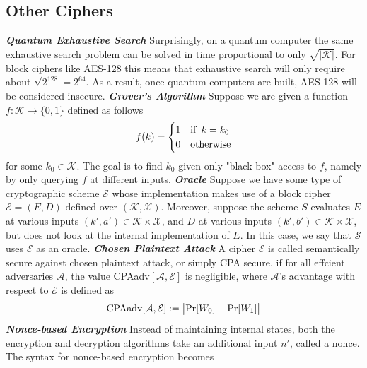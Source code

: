 \documentclass[a4paper,12pt,UTF8]{ctexart}
\begin{document}
\begin{spacing}{1.1}
\subsection{Other Ciphers}
\emph{\textbf{Quantum Exhaustive Search}} Surprisingly, on a quantum computer the same exhaustive search problem can be solved in time proportional to only $\sqrt{|\mathcal{K}|}$. For block ciphers like AES-128 this means that exhaustive search will only require about $\sqrt{2^{128}} =2^{64}$. As a result, once quantum computers are built, AES-128 will be considered insecure. \vspace{3mm}
\newline\indent\emph{\textbf{Grover's Algorithm}} Suppose we are given a function $f :\mathcal{K}\rightarrow\{0,1\}$ defined as follows
\begin{equation}
f(k)=
\begin{cases}
1& {\rm if}\,\; k=k_0\\
0& {\rm otherwise}
\end{cases}
\end{equation}
\indent for some $k_0\in{\mathcal{K}}$. The goal is to find $k_0$ given only "black-box" access to $f$, namely by only querying $f$ at different inputs. \vspace{3mm}
\newline\indent\emph{\textbf{Oracle}} Suppose we have some type of cryptographic scheme $\mathcal{S}$ whose implementation makes use of a block cipher $\mathcal{E} =(E,D)$ defined over $(\mathcal{K},\mathcal{X})$. Moreover, suppose the scheme $S$ evaluates $E$ at various inputs $(k',a')\in{\mathcal{K}\times\mathcal{X}}$, and $D$ at various inputs $(k',b')\in{\mathcal{K}\times\mathcal{X}}$, but does not look at the internal implementation of $E$. In this case, we say that $\mathcal{S}$ uses $\mathcal{E}$ as an oracle. \vspace{3mm}
\newline\indent\emph{\textbf{Chosen Plaintext Attack}} A cipher $\mathcal{E}$ is called semantically secure against chosen plaintext attack, or simply CPA secure, if for all effcient adversaries $\mathcal{A}$, the value CPAadv$[\mathcal{A},\mathcal{E}]$ is negligible, where $\mathcal{A}$'s advantage with respect to $\mathcal{E}$ is defined as
\begin{equation}
{\rm CPAadv}[\mathcal{A},\mathcal{E}]:=\big|{\rm Pr}[W_0] - {\rm Pr}[W_1]\big|
\end{equation}
\indent\emph{\textbf{Nonce-based Encryption}} Instead of maintaining internal states, both the encryption and decryption algorithms take an additional input $n'$, called a nonce. The syntax for nonce-based encryption becomes

\end{spacing}
\end{document}
